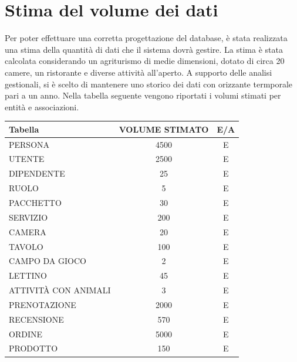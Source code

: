 \documentclass[a4paper,12pt]{report}
\begin{document}
\section{Stima del volume dei dati}
Per poter effettuare una corretta progettazione del database, è stata realizzata una stima della quantità di dati che il sistema dovrà gestire.
La stima è stata calcolata considerando un agriturismo di medie dimensioni, dotato di circa 20 camere, un ristorante e diverse attività all'aperto.
A supporto delle analisi gestionali, si è scelto di mantenere uno storico dei dati con orizzante termporale pari a un anno.
Nella tabella seguente vengono riportati i volumi stimati per entità e associazioni.
\begin{table}[H]
	\centering
	\small
	\renewcommand{\arraystretch}{1.15}
	\begin{tabularx}{\textwidth}{|X|c|c|}
		\hline
		\rowcolor{gray!20}
		\textbf{Tabella}      & \textbf{VOLUME STIMATO} & \textbf{E/A} \\
		\hline
		PERSONA               & 4500                    & E            \\
		UTENTE                & 2500                    & E            \\
		DIPENDENTE            & 25                      & E            \\
		RUOLO                 & 5                       & E            \\
		PACCHETTO             & 30                      & E            \\
		SERVIZIO              & 200                     & E            \\
		CAMERA                & 20                      & E            \\
		TAVOLO                & 100                     & E            \\
		CAMPO DA GIOCO        & 2                       & E            \\
		LETTINO               & 45                      & E            \\
		ATTIVITÀ CON ANIMALI  & 3                       & E            \\
		PRENOTAZIONE          & 2000                    & E            \\
		RECENSIONE            & 570                     & E            \\
		ORDINE                & 5000                    & E            \\
		PRODOTTO              & 150                     & E            \\

\end{tabularx}
\end{table}
\end{document}
